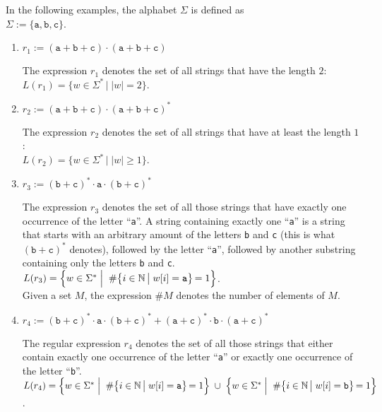 \examplesEng
In the following examples, the alphabet  $\Sigma$ is defined as
\\[0.2cm]
\hspace*{1.3cm}
$\Sigma := \{ \texttt{a}, \texttt{b}, \texttt{c} \}$.
\begin{enumerate}
\item $r_1 := (\texttt{a} + \texttt{b} + \texttt{c}) \cdot (\texttt{a} + \texttt{b} + \texttt{c})$

      The expression  $r_1$ denotes the set of all strings that have the length $2$:
      \\[0.2cm]
      \hspace*{1.3cm}
      $L(r_1) = \bigl\{ w \in \Sigma^* \,\big|\; |w| = 2 \bigr\}$.
\item $r_2 := (\texttt{a} + \texttt{b} + \texttt{c}) \cdot (\texttt{a} + \texttt{b} + \texttt{c})^*$

      The expression  $r_2$ denotes the set of all strings that have at least the length $1$:
      \\[0.2cm]
      \hspace*{1.3cm}
      $L(r_2) = \bigl\{ w \in \Sigma^* \,\big|\; |w| \geq 1 \bigr\}$.
\item $r_3 := (\texttt{b} + \texttt{c})^* \cdot \texttt{a} \cdot 
              (\texttt{b} + \texttt{c})^*$

      The expression $r_3$ denotes the set of all those strings that have exactly one occurrence of
      the letter ``\texttt{a}''.  A string containing exactly one ``\texttt{a}''
      is a string that starts with an arbitrary amount of the letters \texttt{b} and \texttt{c} 
      (this is what $(\texttt{b} + \texttt{c})^*$ denotes), followed by the letter ``\texttt{a}'',
      followed by another substring containing only the letters \texttt{b} and \texttt{c}.
      \\[0.2cm]
      \hspace*{1.3cm}
      $L(r_3) = \Bigl\{ w \in \Sigma^* \;\Big|\;\; 
                        \#\bigl\{i \in  \mathbb{N} \,\big|\; w[i] = \texttt{a} \bigl\} \,= 1 \Bigr\}$.
      \\[0.2cm]
      Given a set $M$, the expression $\#M$  denotes the number of elements of $M$.
\item $r_4 :=  (\texttt{b} + \texttt{c})^* \cdot \texttt{a} \cdot (\texttt{b} + \texttt{c})^* +
               (\texttt{a} + \texttt{c})^* \cdot \texttt{b} \cdot (\texttt{a} + \texttt{c})^*$

      The regular expression $r_4$ denotes the set of all those strings that either contain exactly
      one occurrence of the letter ``\texttt{a}'' or exactly one occurrence of the letter ``\texttt{b}''.
      \\[0.2cm]
      \hspace*{0.3cm}
      $L(r_4) = \Bigl\{ w \in \Sigma^* \;\Big|\;\; 
                        \#\bigl\{i \in \mathbb{N} \,\big|\; w[i] = \texttt{a} \bigl\} \,=
                        1 \Bigr\} \;\cup\;
                \Bigl\{ w \in \Sigma^* \;\Big|\;\; 
                        \#\bigl\{i \in \mathbb{N} \,\big|\; w[i] = \texttt{b} \bigl\} \,=
                        1 \Bigr\}$.  \eox 
\end{enumerate}

